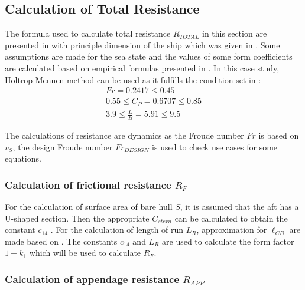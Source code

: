 \subsection{Calculation of Total Resistance}\label{sec:Rtot_calc_method}

The formula used to calculate total resistance $R_{TOTAL}$ in this section are presented in  with principle dimension of the ship which was given in . Some assumptions are made for the sea state and the values of some form coefficients are calculated based on empirical formulas presented in . In this case study, Holtrop-Mennen method can be used as it fulfills the condition set in :
\begin{equation}
    \label{eqn:holtrop_cond_fulfill}
    \begin{gathered}
        Fr = 0.2417  \leqslant 0.45 \\
        0.55 \leqslant C_P = 0.6707 \leqslant 0.85 \\
        3.9 \leqslant \frac{L}{B} = 5.91 \leqslant 9.5
    \end{gathered}
\end{equation}

The calculations of resistance are dynamics as the Froude number $Fr$ is based on $v_S$, the design Froude number $Fr_{DESIGN}$ is used to check use cases for some equations.

\subsubsection*{Calculation of frictional resistance $R_F$}

For the calculation of surface area of bare hull $S$, it is assumed that the aft has a U-shaped section. Then the appropriate $C_{stern}$ can be calculated to obtain the constant $c_{14}$ . For the calculation of length of run $L_R$, approximation for $\ell_{CB}$ are made based on . The constants $c_{14}$ and $L_R$ are used to calculate the form factor $1+k_1$ which will be used to calculate $R_F$.

\subsubsection*{Calculation of appendage resistance $R_{APP}$}

